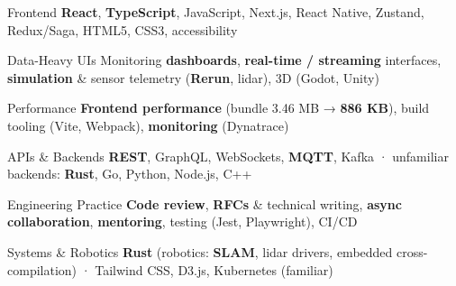 
\begin{cvskills}

  \cvskill
  {Frontend}
  {\textbf{React}, \textbf{TypeScript}, JavaScript, Next.js, React Native, Zustand, Redux/Saga, HTML5, CSS3, accessibility}

  \cvskill
  {Data-Heavy UIs}
  {Monitoring \textbf{dashboards}, \textbf{real-time / streaming} interfaces, \textbf{simulation} \& sensor telemetry (\textbf{Rerun}, lidar), 3D (Godot, Unity)}

  \cvskill
  {Performance}
  {\textbf{Frontend performance} (bundle 3.46 MB → \textbf{886 KB}), build tooling (Vite, Webpack), \textbf{monitoring} (Dynatrace)}

  \cvskill
  {APIs \& Backends}
  {\textbf{REST}, GraphQL, WebSockets, \textbf{MQTT}, Kafka · unfamiliar backends: \textbf{Rust}, Go, Python, Node.js, C++}

  \cvskill
  {Engineering Practice}
  {\textbf{Code review}, \textbf{RFCs} \& technical writing, \textbf{async collaboration}, \textbf{mentoring}, testing (Jest, Playwright), CI/CD}

  \cvskill
  {Systems \& Robotics}
  {\textbf{Rust} (robotics: \textbf{SLAM}, lidar drivers, embedded cross-compilation) · Tailwind CSS, D3.js, Kubernetes (familiar)}

\end{cvskills}
